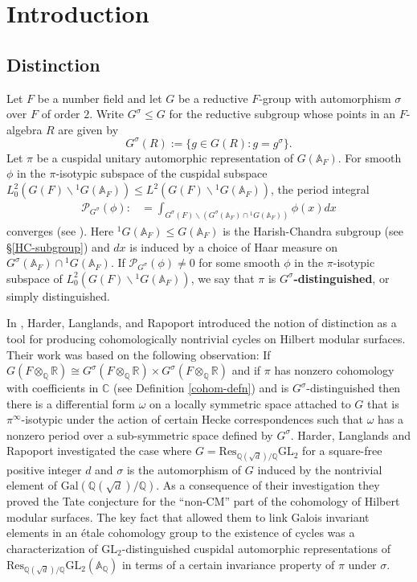 \documentclass[12pt]{amsart}
\theoremstyle{remark}
\numberwithin{equation}{section}
\newcommand{\A}{\mathbb{A}}
\newcommand{\GL}{\mathrm{GL}}
\newcommand{\Gal}{\mathrm{Gal}}
\newcommand{\QQ}{\mathbb{Q}}
\newcommand{\CC}{\mathbb{C}}
\newcommand{\RR}{\mathbb{R}}
\theoremstyle{definition}
\numberwithin{equation}{subsection}
\begin{document}
\tableofcontents

\section{Introduction}

\subsection{Distinction} Let $F$ be a number field and let $G$ be a reductive $F$-group with automorphism $\sigma$ over $F$ of order $2$.
Write $G^{\sigma} \leq G$ for the reductive subgroup whose points in an $F$-algebra $R$ are given by
$$
G^{\sigma}(R):=\{g \in G(R): g=g^{\sigma}\}.
$$
Let $\pi$ be a cuspidal unitary automorphic representation of $G(\A_F)$. For smooth $\phi$ in the $\pi$-isotypic subspace of the cuspidal subspace $L^2_{0}(G(F) \backslash {}^1G(\A_F)) \leq L^2(G(F) \backslash {}^1G(\A_F))$, the period integral
\begin{align} \label{period}
\mathcal{P}_{G^{\sigma}}(\phi):&=\int_{G^{\sigma}(F) \backslash (G^{\sigma}(\A_F) \cap {}^1G(\A_F))} \phi(x) dx
\end{align}converges (see \cite[Proposition 1, \S 2]{AGR}).
Here ${}^1G(\A_F) \leq G(\A_F)$ is the Harish-Chandra subgroup
(see \S \ref{HC-subgroup}) and $dx$ is induced by a choice of Haar
measure on $G^{\sigma}(\A_F) \cap {}^1G(\A_F)$.
  If $\mathcal{P}_{G^{\sigma}}(\phi) \neq 0$  for some smooth $\phi$ in the $\pi$-isotypic subspace of $L^2_{0}(G(F) \backslash {}^1G(\A_F))$, we say that $\pi$ is \textbf{$G^{\sigma}$-distinguished}, or simply distinguished.

In \cite{HLR}, Harder, Langlands, and Rapoport  introduced the notion of distinction as a tool for
producing cohomologically nontrivial cycles on Hilbert modular surfaces. Their work was based on the following
observation: If $G(F \otimes_{\QQ}\RR) \cong G^{\sigma}(F \otimes_{\QQ}\RR) \times G^{\sigma}(F \otimes_{\QQ} \RR)$ and if $\pi$ has nonzero cohomology with coefficients in $\CC$ (see Definition \ref{cohom-defn}) and is $G^{\sigma}$-distinguished then
there is a differential form $\omega$ on a locally symmetric space attached to $G$ that is
$\pi^{\infty}$-isotypic under the action of certain Hecke correspondences such that $\omega$
has a nonzero period over a sub-symmetric space defined by $G^{\sigma}$.   Harder, Langlands and
Rapoport investigated the case where $G=\mathrm{Res}_{\QQ(\sqrt{d})/\QQ}\GL_2$ for a
square-free positive integer $d$ and $\sigma$ is the automorphism of $G$ induced by the
nontrivial element of $\Gal(\QQ(\sqrt{d})/\QQ)$.
As a consequence of their investigation they proved the Tate conjecture for the ``non-CM''
part of the cohomology of Hilbert modular surfaces.
The key fact that allowed them to link Galois invariant elements in an \'etale cohomology group to the existence of cycles was a characterization of $\GL_2$-distinguished cuspidal automorphic representations of $\mathrm{Res}_{\QQ(\sqrt{d})/\QQ}\GL_2(\A_{\QQ})$ in terms of a certain invariance property of $\pi$ under $\sigma$.
\end{document}
